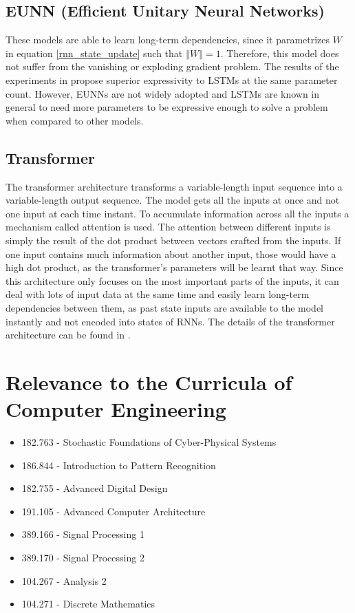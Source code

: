 \documentclass{article}
\begin{document}
\subsection{EUNN (Efficient Unitary Neural Networks)}
These models are able to learn long-term dependencies, since it parametrizes $W$ in equation \ref{rnn_state_update} such that $\left\Vert W \right\Vert = 1$. 
Therefore, this model does not suffer from the vanishing or exploding gradient problem. The results of the experiments in \cite{EfficientUnitaryRNNs} propose superior expressivity to LSTMs at the same parameter count.
However, EUNNs are not widely adopted and LSTMs are known in general to need more parameters to be expressive enough to solve a problem when compared to other models.
\subsection{Transformer}
The transformer architecture transforms a variable-length input sequence into a variable-length output sequence. 
The model gets all the inputs at once and not one input at each time instant. 
To accumulate information across all the inputs a mechanism called attention is used.
The attention between different inputs is simply the result of the dot product between vectors crafted from the inputs. 
If one input contains much information about another input, those would have a high dot product, as the transformer's parameters will be learnt that way.
Since this architecture only focuses on the most important parts of the inputs, it can deal with lots of input data at the same time and easily learn long-term dependencies between them, as past state inputs are available to the model instantly and not encoded into states of RNNs.
The details of the transformer architecture can be found in \cite{Transformer}.
\section{Relevance to the Curricula of Computer Engineering}
\begin{itemize}
    \item{182.763 - Stochastic Foundations of Cyber-Physical Systems}
    \item{186.844 - Introduction to Pattern Recognition}
    \item{182.755 - Advanced Digital Design}
    \item{191.105 - Advanced Computer Architecture}
    \item{389.166 - Signal Processing 1}
    \item{389.170 - Signal Processing 2}
    \item{104.267 - Analysis 2}
    \item{104.271 - Discrete Mathematics}
\end{itemize}
\printbibliography
\end{document}
